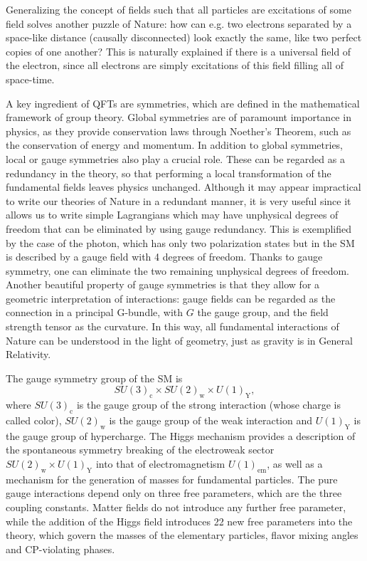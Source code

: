 Generalizing the concept of fields such that all particles are excitations of some field solves another puzzle of Nature: how can e.g. two electrons separated by a space-like distance (causally disconnected) look exactly the same, like two perfect copies of one another? This is naturally explained if there is a universal field of the electron, since all electrons are simply excitations of this field filling all of space-time. 

A key ingredient of QFTs are symmetries, which are defined in the mathematical framework of group theory. Global symmetries are of paramount importance in physics, as they provide conservation laws through Noether's Theorem, such as the conservation of energy and momentum. In addition to global symmetries, local or gauge symmetries also play a crucial role. These can be regarded as a redundancy in the theory, so that performing a local transformation of the fundamental fields leaves physics unchanged. Although it may appear impractical to write our theories of Nature in a redundant manner, it is very useful since it allows us to write simple Lagrangians which may have unphysical degrees of freedom that can be eliminated by using gauge redundancy. This is exemplified by the case of the photon, which has only two polarization states but in the SM is described by a gauge field with 4 degrees of freedom. Thanks to gauge symmetry, one can eliminate the two remaining unphysical degrees of freedom. Another beautiful property of gauge symmetries is that they allow for a geometric interpretation of interactions: gauge fields can be regarded as the connection in a principal G-bundle, with $G$ the gauge group, and the field strength tensor as the curvature. In this way, all fundamental interactions of Nature can be understood in the light of geometry, just as gravity is in General Relativity.

The gauge symmetry group of the SM is
\begin{equation*}
SU(3)_{\textrm{c}}\times SU(2)_{\textrm{w}}\times U(1)_{\textrm{Y}},
\end{equation*}
where $SU(3)_{\textrm{c}}$ is the gauge group of the strong interaction (whose charge is called color), $SU(2)_{\textrm{w}}$ is the gauge group of the weak interaction and $U(1)_{\textrm{Y}}$ is the gauge group of hypercharge. The Higgs mechanism provides a description of the spontaneous symmetry breaking of the electroweak sector $SU(2)_{\textrm{w}}\times U(1)_{\textrm{Y}}$ into that of electromagnetism $U(1)_{\textrm{em}}$, as well as a mechanism for the generation of masses for fundamental particles. The pure gauge interactions depend only on three free parameters, which are the three coupling constants. Matter fields do not introduce any further free parameter, while the addition of the Higgs field introduces 22 new free parameters into the theory, which govern the masses of the elementary particles, flavor mixing angles and CP-violating phases.

